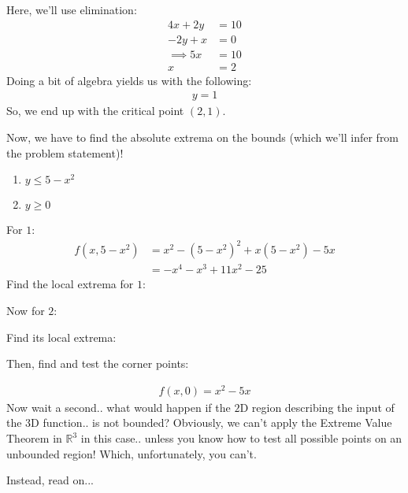 Here, we'll use elimination:
\begin{align*}
	4x+2y&=10\\
	-2y+x&=0\\
	\implies 5x&=10\\
	x&=2
\end{align*}
Doing a bit of algebra yields us with the following:
\begin{align*}
	y=1
\end{align*}
So, we end up with the critical point $(2, 1)$.

Now, we have to find the absolute extrema on the bounds (which we'll infer from the problem statement)!
\begin{enumerate}
	\item $y\leq 5-x^2$
	\item $y\geq 0$
\end{enumerate}

For $1$:
\begin{align*}
	f(x, 5-x^2) &= x^2-(5-x^2)^2+x(5-x^2)-5x\\
	&= -x^4-x^3+11x^2-25
\end{align*}
Find the local extrema for $1$:

Now for $2$:

Find its local extrema:

Then, find and test the corner points:

\begin{align*}
	f(x, 0) = x^2-5x
\end{align*}
Now wait a second.. what would happen if the $2$D region describing the input of the $3$D function.. is not bounded?
Obviously, we can't apply the Extreme Value Theorem in $\mathbb{R}^3$ in this case.. unless you know how to test all possible points on an unbounded region!
Which, unfortunately, you can't.

Instead, read on...